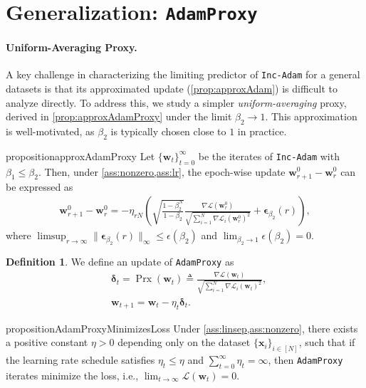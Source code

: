 \documentclass{article} %
\theoremstyle{plain}
\theoremstyle{definition}
\newtheorem{definition}[theorem]{Definition}
\theoremstyle{remark}
\def\bigopen#1{\left(#1\right)}
\newcommand{\Ls}{\mathcal{L}}
\def\bdel{{\boldsymbol \delta}}
\def\bx{{\mathbf x}}
\def\bw{{\mathbf w}}
\DeclareMathOperator{\proxy}{Prx}
\begin{document}
\section{Generalization: \texttt{AdamProxy}}\label{sec:generalization}

\paragraph{Uniform-Averaging Proxy.} 
A key challenge in characterizing the limiting predictor of \texttt{Inc-Adam} for a general datasets is that its approximated update (\cref{prop:approxAdam}) is difficult to analyze directly. To address this, we study a simpler \textit{uniform-averaging} proxy, derived in \cref{prop:approxAdamProxy} under the limit $\beta_2 \rightarrow 1$. This approximation is well-motivated, as $\beta_2$ is typically chosen close to $1$ in practice. 

\begin{restatable}{proposition}{approxAdamProxy}\label{prop:approxAdamProxy}
    Let $\{\bw_t\}_{t=0}^\infty$ be the iterates of \textnormal{\texttt{Inc-Adam}} with $\beta_1 \leq \beta_2$. Then, under \cref{ass:nonzero,ass:lr}, the epoch-wise update $\bw_{r+1}^0-\bw_{r}^0$ can be expressed as
    \begin{align*}
        \bw_{r+1}^0-\bw_{r}^0 = -\eta_{rN} \bigopen{\sqrt{\frac{1-\beta_2^N}{1-\beta_2}} \frac{\nabla \Ls(\bw_r^0)}{\sqrt{\sum_{i=1}^N \nabla\Ls_i(\bw_r^0)^2}}+\boldsymbol{\epsilon}_{\beta_2}(r)},
    \end{align*}
    where $\limsup_{r\rightarrow\infty}\|\boldsymbol{\epsilon}_{\beta_2}(r)\|_{\infty} \leq \epsilon(\beta_2)$ and $\lim_{\beta_2 \rightarrow 1} \epsilon(\beta_2) =0$.
\end{restatable}

\begin{definition}
    We define an update of \texttt{AdamProxy} as
    \begin{equation}\label{eq:AdamProxy}
        \begin{split}
            &\bdel_t = \proxy(\bw_t)\triangleq \frac{\nabla \Ls(\bw_t)}{\sqrt{\sum_{i=1}^N \nabla\Ls_i(\bw_t)^2}}, \\
        &\bw_{t+1} = \bw_t - \eta_t \bdel_t.
        \end{split}
    \end{equation}
\end{definition}


\begin{restatable}{proposition}{AdamProxyMinimizesLoss}\label{prop:AdamProxyMinimizesLoss}
    Under \cref{ass:linsep,ass:nonzero}, there exists a positive constant $\eta>0$ depending only on the dataset $\{\bx_i\}_{i \in [N]}$, such that if the learning rate schedule satisfies $\eta_t \leq \eta$ and $\sum_{t=0}^\infty \eta_t = \infty$, then \textnormal{\texttt{AdamProxy}} iterates minimize the loss, i.e., $\lim_{t\rightarrow\infty} \Ls(\bw_t) = 0$.
\end{restatable}
\end{document}
